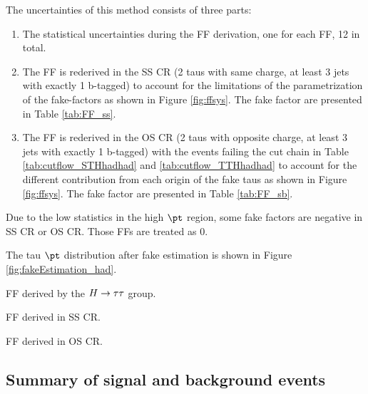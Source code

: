 The uncertainties of this method consists of three parts:
\begin{enumerate}

\item The statistical uncertainties during the FF derivation, one for each FF, 12 in total.

\item The FF is rederived in the SS CR (2 taus with same charge, at least 3 jets with exactly 1 b-tagged) to account for the limitations of the parametrization of the fake-factors as shown in Figure \ref{fig:ffsys}. The fake factor are presented in Table \ref{tab:FF_ss}. 

\item The FF is rederived in the OS CR (2 taus with opposite charge, at least 3 jets with exactly 1 b-tagged) with the events failing the cut chain in Table \ref{tab:cutflow_STHhadhad} and \ref{tab:cutflow_TTHhadhad} to account for the different contribution from each origin of the fake taus as shown in Figure \ref{fig:ffsys}. The fake factor are presented in Table \ref{tab:FF_sb}.

\end{enumerate}



Due to the low statistics in the high $\pt$ region, some fake factors are negative in SS CR or OS CR. Those FFs are treated as 0.

The tau $\pt$ distribution after fake estimation is shown in Figure \ref{fig:fakeEstimation_had}.

\begin{table}
\caption{FF derived by the $H \rightarrow \tau\tau$ group.}
\label{tab:FF_htautau}

\end{table}

\begin{table}
\caption{FF derived in SS CR.}
\label{tab:FF_ss}

\end{table}

\begin{table}
\caption{FF derived in OS CR.}
\label{tab:FF_sb}

\end{table}


\subsection{Summary of signal and background events}
\label{sec:background_hadhad}


